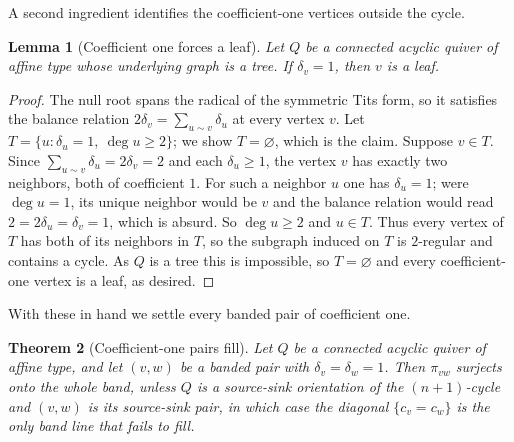 \documentclass[11pt, a4paper]{amsart}
\newtheorem{theorem}{Theorem}[section]
\newtheorem{lemma}[theorem]{Lemma}
\theoremstyle{definition}
\begin{document}
A second ingredient identifies the coefficient-one vertices outside the
cycle.

\begin{lemma}[Coefficient one forces a leaf]
\label{lem:mark_one_leaf}
Let $Q$ be a connected acyclic quiver of affine type whose underlying graph
is a tree. If $\delta_v = 1$, then $v$ is a leaf.
\end{lemma}

\begin{proof}
The null root spans the radical of the symmetric Tits form, so it satisfies
the balance relation $2\delta_v = \sum_{u \sim v}\delta_u$ at every vertex
$v$. Let $T = \{u : \delta_u = 1,\ \deg u \geq 2\}$; we show $T =
\varnothing$, which is the claim. Suppose $v \in T$. Since $\sum_{u \sim v}
\delta_u = 2\delta_v = 2$ and each $\delta_u \geq 1$, the vertex $v$ has
exactly two neighbors, both of coefficient $1$. For such a neighbor $u$ one
has $\delta_u = 1$; were $\deg u = 1$, its unique neighbor would be $v$ and
the balance relation would read $2 = 2\delta_u = \delta_v = 1$, which is
absurd. So $\deg u \geq 2$ and $u \in T$. Thus every vertex of $T$ has both
of its neighbors in $T$, so the subgraph induced on $T$ is $2$-regular and
contains a cycle. As $Q$ is a tree this is impossible, so $T = \varnothing$
and every coefficient-one vertex is a leaf, as desired.
\end{proof}

With these in hand we settle every banded pair of coefficient one.

\begin{theorem}[Coefficient-one pairs fill]
\label{thm:delta_one}
Let $Q$ be a connected acyclic quiver of affine type, and let $(v, w)$ be a
banded pair with $\delta_v = \delta_w = 1$. Then $\pi_{vw}$ surjects onto the
whole band, unless $Q$ is a source-sink orientation of the $(n+1)$-cycle and
$(v, w)$ is its source-sink pair, in which case the diagonal $\{c_v = c_w\}$
is the only band line that fails to fill.
\end{theorem}
\end{document}
